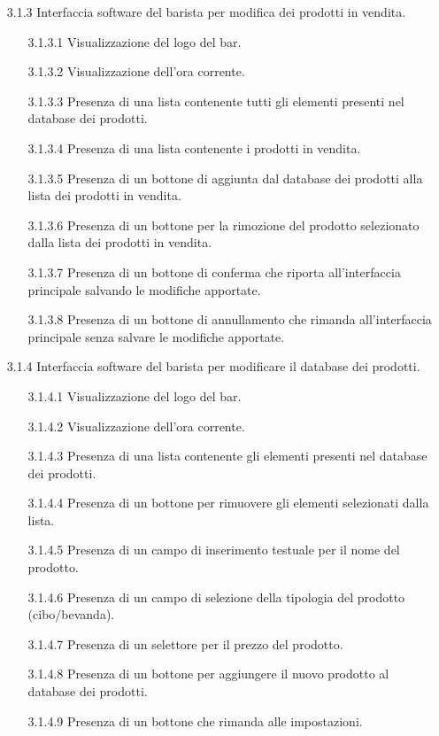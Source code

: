 \documentclass[a4paper,11pt]{article}       %
\begin{document}
\begin{itemize}
            \item[3.1.3] Interfaccia software del barista per modifica dei prodotti in vendita.
                \begin{itemize}
                    \item[3.1.3.1] Visualizzazione del logo del bar.
                    \item[3.1.3.2] Visualizzazione dell'ora corrente.
                    \item[3.1.3.3] Presenza di una lista contenente tutti gli elementi presenti nel \gls{database} dei prodotti.
                    \item[3.1.3.4] Presenza di una lista contenente i prodotti in vendita.
                    \item[3.1.3.5] Presenza di un bottone di aggiunta dal \gls{database} dei prodotti alla lista dei prodotti in vendita.
                    \item[3.1.3.6] Presenza di un bottone per la rimozione del prodotto selezionato dalla lista dei prodotti in vendita.
                    \item[3.1.3.7] Presenza di un bottone di conferma che riporta all'interfaccia principale salvando le modifiche apportate.
                    \item[3.1.3.8] Presenza di un bottone di annullamento che rimanda all'interfaccia principale senza salvare le modifiche apportate.
                \end{itemize}
                
            \item[3.1.4] Interfaccia software del barista per modificare il \gls{database} dei prodotti.
                \begin{itemize}
                    \item[3.1.4.1] Visualizzazione del logo del bar.
                    \item[3.1.4.2] Visualizzazione dell'ora corrente.
                    \item[3.1.4.3] Presenza di una lista contenente gli elementi presenti nel \gls{database} dei prodotti.
                    \item[3.1.4.4] Presenza di un bottone per rimuovere gli elementi selezionati dalla lista.
                    \item[3.1.4.5] Presenza di un campo di inserimento testuale per il nome del prodotto.
                    \item[3.1.4.6] Presenza di un campo di selezione della tipologia del prodotto (cibo/bevanda).
                    \item[3.1.4.7] Presenza di un selettore per il prezzo del prodotto.
                    \item[3.1.4.8] Presenza di un bottone per aggiungere il nuovo prodotto al \gls{database} dei prodotti.
                    \item[3.1.4.9] Presenza di un bottone che rimanda alle impostazioni.
                \end{itemize}
                

\end{itemize}
\end{document}
